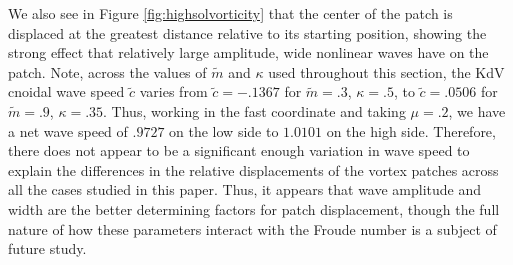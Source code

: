 \documentclass[a4paper,11pt]{article}
\begin{document}
We also see in Figure \ref{fig:highsolvorticity} that the center of the patch is displaced at the greatest distance relative to its starting position, showing the strong effect that relatively large amplitude, wide nonlinear waves have on the patch.  Note, across the values of $\tilde{m}$ and $\kappa$ used throughout this section, the KdV cnoidal wave speed $\tilde{c}$ varies from $\tilde{c}=-.1367$ for $\tilde{m}=.3$, $\kappa =.5$, to $\tilde{c}=.0506$ for $\tilde{m}=.9$, $\kappa=.35$.  Thus, working in the fast coordinate and taking $\mu=.2$, we have a net wave speed of $.9727$ on the low side to $1.0101$ on the high side.  Therefore, there does not appear to be a significant enough variation in wave speed to explain the differences in the relative displacements of the vortex patches across all the cases studied in this paper.  Thus, it appears that wave amplitude and width are the better determining factors for patch displacement, though the full nature of how these parameters interact with the Froude number is a subject of future study.  
\end{document}
